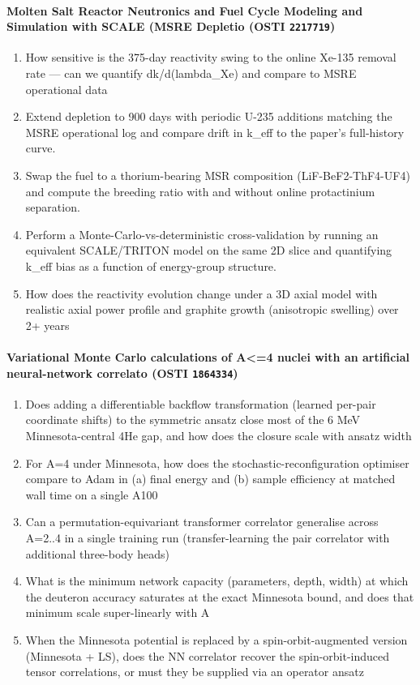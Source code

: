 \documentclass[11pt]{article}
\begin{document}
\paragraph{Molten Salt Reactor Neutronics and Fuel Cycle Modeling and Simulation with SCALE (MSRE Depletio \textnormal{\small(OSTI \texttt{2217719})}}
\begin{enumerate}[leftmargin=1.6em,itemsep=0.2em,topsep=0.2em,label=Q\arabic*.]
\item How sensitive is the 375-day reactivity swing to the online Xe-135 removal rate --- can we quantify dk/d(lambda\_Xe) and compare to MSRE operational data
\item Extend depletion to 900 days with periodic U-235 additions matching the MSRE operational log and compare drift in k\_eff to the paper's full-history curve.
\item Swap the fuel to a thorium-bearing MSR composition (LiF-BeF2-ThF4-UF4) and compute the breeding ratio with and without online protactinium separation.
\item Perform a Monte-Carlo-vs-deterministic cross-validation by running an equivalent SCALE/TRITON model on the same 2D slice and quantifying k\_eff bias as a function of energy-group structure.
\item How does the reactivity evolution change under a 3D axial model with realistic axial power profile and graphite growth (anisotropic swelling) over 2+ years
\end{enumerate}
\paragraph{Variational Monte Carlo calculations of A\textless{}=4 nuclei with an artificial neural-network correlato \textnormal{\small(OSTI \texttt{1864334})}}
\begin{enumerate}[leftmargin=1.6em,itemsep=0.2em,topsep=0.2em,label=Q\arabic*.]
\item Does adding a differentiable backflow transformation (learned per-pair coordinate shifts) to the symmetric ansatz close most of the 6 MeV Minnesota-central 4He gap, and how does the closure scale with ansatz width
\item For A=4 under Minnesota, how does the stochastic-reconfiguration optimiser compare to Adam in (a) final energy and (b) sample efficiency at matched wall time on a single A100
\item Can a permutation-equivariant transformer correlator generalise across A=2..4 in a single training run (transfer-learning the pair correlator with additional three-body heads)
\item What is the minimum network capacity (parameters, depth, width) at which the deuteron accuracy saturates at the exact Minnesota bound, and does that minimum scale super-linearly with A
\item When the Minnesota potential is replaced by a spin-orbit-augmented version (Minnesota + LS), does the NN correlator recover the spin-orbit-induced tensor correlations, or must they be supplied via an operator ansatz
\end{enumerate}
\end{document}
